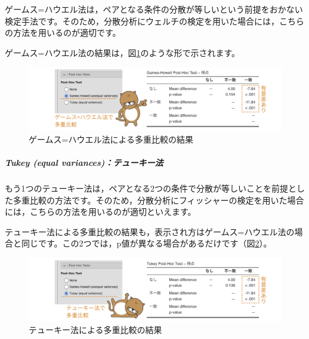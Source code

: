 \documentclass[
  12pt,
  a5jpaper,
  lualatex, ja=standard]{bxjsbook}
\begin{document}
ゲームス=ハウエル法は，ペアとなる条件の分散が等しいという前提をおかない検定手法です。そのため，分散分析にウェルチの検定を用いた場合には，こちらの方法を用いるのが適切です。

ゲームス=ハウエル法の結果は，図\ref{fig:ANOVA-oneway-posthoc-games}のような形で示されます。

\begin{figure}[!ht]

{\centering \includegraphics[width=1\linewidth]{images/ANOVA/oneway-posthoc-games} 

}

\caption{ゲームス=ハウエル法による多重比較の結果}\label{fig:ANOVA-oneway-posthoc-games}
\end{figure}

\hypertarget{tukey-equal-variancesux30c6ux30e5ux30fcux30adux30fcux6cd5}{%
\subparagraph*{Tukey (equal variances)：テューキー法}\label{tukey-equal-variancesux30c6ux30e5ux30fcux30adux30fcux6cd5}}

もう1つのテューキー法は，ペアとなる2つの条件で分散が等しいことを前提とした多重比較の方法です。そのため，分散分析にフィッシャーの検定を用いた場合には，こちらの方法を用いるのが適切といえます。

テューキー法による多重比較の結果も，表示され方はゲームス=ハウエル法の場合と同じです。この2つでは，p値が異なる場合があるだけです（図\ref{fig:ANOVA-oneway-posthoc-tukey}）。

\begin{figure}[!ht]

{\centering \includegraphics[width=1\linewidth]{images/ANOVA/oneway-posthoc-tukey} 

}

\caption{テューキー法による多重比較の結果}\label{fig:ANOVA-oneway-posthoc-tukey}
\end{figure}
\end{document}
